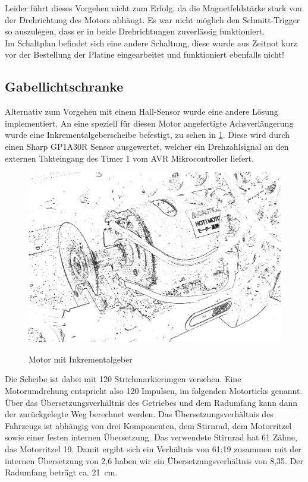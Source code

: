 Leider führt dieses Vorgehen nicht zum Erfolg, da die Magnetfeldstärke stark von der Drehrichtung des Motors abhängt. Es war nicht möglich
den Schmitt-Trigger so auszulegen, dass er in beide Drehrichtungen zuverlässig funktioniert.\\

Im Schaltplan befindet sich eine andere Schaltung, diese wurde aus Zeitnot kurz vor der Bestellung der Platine eingearbeitet und funktioniert ebenfalls nicht!

\subsection{Gabellichtschranke}

Alternativ zum Vorgehen mit einem Hall-Sensor wurde eine andere Lö\-sung implementiert. An eine speziell für diesen Motor angefertigte Achsverlängerung wurde eine Inkrementalgeberscheibe befestigt, zu sehen in \cref{fig:gabellichtschranke}. 
Diese wird durch einen Sharp GP1A30R Sensor ausgewertet, welcher ein Drehzahlsignal an den externen Takteingang des Timer 1 vom AVR Mikrocontroller liefert.
\begin{figure}[H]
\centering
\includegraphics[width=.8\textwidth]{odometrie.png}\\
\caption{Motor mit Inkrementalgeber}%
\label{fig:gabellichtschranke}
\end{figure}

Die Scheibe ist dabei mit 120 Strichmarkierungen versehen. Eine Motorumdrehung entspricht also 120 Impulsen, im folgenden Motorticks genannt. Über das Übersetzungsverhältnis des Getriebes und dem Radumfang kann dann 
der zurückgelegte Weg berechnet werden. Das Übersetzungsverhältnis des Fahrzeugs ist abhängig von drei Komponenten, dem Stirnrad, dem Motorritzel sowie einer festen internen Übersetzung. Das verwendete Stirnrad hat
61 Zähne, das Motorritzel 19. Damit ergibt sich ein Verhältnis von 61:19 zusammen mit der internen Übersetzung von 2,6 \cite{uebersetzung}
haben wir ein Übersetzungsverhältnis von 8,35. Der Radumfang beträgt ca. \SI{21}{\cm}.

